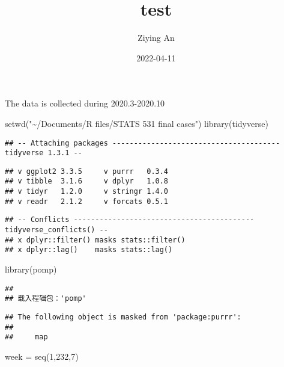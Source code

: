 \documentclass[
]{article}
\title{test}
\author{Ziying An}
\date{2022-04-11}
\newenvironment{Shaded}{\begin{snugshade}}{\end{snugshade}}
\newcommand{\DecValTok}[1]{\textcolor[rgb]{0.00,0.00,0.81}{#1}}
\newcommand{\FunctionTok}[1]{\textcolor[rgb]{0.00,0.00,0.00}{#1}}
\newcommand{\NormalTok}[1]{#1}
\newcommand{\OtherTok}[1]{\textcolor[rgb]{0.56,0.35,0.01}{#1}}
\newcommand{\StringTok}[1]{\textcolor[rgb]{0.31,0.60,0.02}{#1}}
\begin{document}
\maketitle

The data is collected during 2020.3-2020.10

\begin{Shaded}
\begin{Highlighting}[]
\FunctionTok{setwd}\NormalTok{(}\StringTok{"\textasciitilde{}/Documents/R files/STATS 531 final cases"}\NormalTok{)}
\FunctionTok{library}\NormalTok{(tidyverse)}
\end{Highlighting}
\end{Shaded}

\begin{verbatim}
## -- Attaching packages --------------------------------------- tidyverse 1.3.1 --
\end{verbatim}

\begin{verbatim}
## v ggplot2 3.3.5     v purrr   0.3.4
## v tibble  3.1.6     v dplyr   1.0.8
## v tidyr   1.2.0     v stringr 1.4.0
## v readr   2.1.2     v forcats 0.5.1
\end{verbatim}

\begin{verbatim}
## -- Conflicts ------------------------------------------ tidyverse_conflicts() --
## x dplyr::filter() masks stats::filter()
## x dplyr::lag()    masks stats::lag()
\end{verbatim}

\begin{Shaded}
\begin{Highlighting}[]
\FunctionTok{library}\NormalTok{(pomp)}
\end{Highlighting}
\end{Shaded}

\begin{verbatim}
## 
## 载入程辑包：'pomp'
\end{verbatim}

\begin{verbatim}
## The following object is masked from 'package:purrr':
## 
##     map
\end{verbatim}

\begin{Shaded}
\begin{Highlighting}[]
\NormalTok{week }\OtherTok{=} \FunctionTok{seq}\NormalTok{(}\DecValTok{1}\NormalTok{,}\DecValTok{232}\NormalTok{,}\DecValTok{7}\NormalTok{)}
\end{Highlighting}
\end{Shaded}
\end{document}
